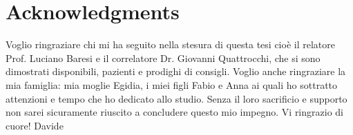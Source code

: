 
\bigskip

\begingroup
\let\clearpage\relax
\let\cleardoublepage\relax
\let\cleardoublepage\relax
\chapter*{Acknowledgments}
Voglio ringraziare chi mi ha seguito nella stesura di questa tesi
cioè il relatore Prof. Luciano Baresi e il correlatore Dr. Giovanni
Quattrocchi, che si sono dimostrati disponibili, pazienti e prodighi
di consigli. 
Voglio anche ringraziare la mia famiglia: mia moglie Egidia, i miei 
figli Fabio e Anna ai quali ho sottratto attenzioni e tempo che ho dedicato
allo studio. Senza il loro sacrificio e supporto non sarei sicuramente
riuscito a concludere questo mio impegno. 
Vi ringrazio di cuore!
Davide

\endgroup